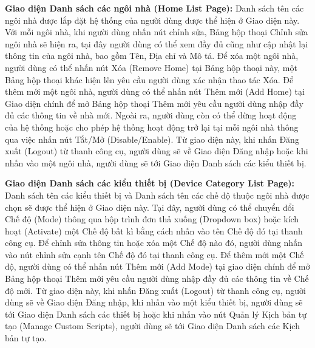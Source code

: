 \documentclass[11pt,a4paper,oneside]{book}
\begin{document}
\textbf{Giao diện Danh sách các ngôi nhà (Home List Page):} Danh sách tên các ngôi nhà được lắp đặt hệ thống của người dùng được thể hiện ở Giao diện này. Với mỗi ngôi nhà, khi người dùng nhấn nút chỉnh sửa, Bảng hộp thoại Chỉnh sửa ngôi nhà sẽ hiện ra, tại đây người dùng có thể xem đầy đủ cũng như cập nhật lại thông tin của ngôi nhà, bao gồm Tên, Địa chỉ và Mô tả. Để xóa một ngôi nhà, người dùng có thể nhấn nút Xóa (Remove Home) tại Bảng hộp thoại này, một Bảng hộp thoại khác hiện lên yêu cầu người dùng xác nhận thao tác Xóa. Để thêm mới một ngôi nhà, người dùng có thể nhấn nút Thêm mới (Add Home) tại Giao diện chính để mở Bảng hộp thoại Thêm mới yêu cầu người dùng nhập đầy đủ các thông tin về nhà mới. Ngoài ra, người dùng còn có thể dừng hoạt động của hệ thống hoặc cho phép hệ thống hoạt động trở lại tại mỗi ngôi nhà thông qua việc nhấn nút Tắt/Mở (Disable/Enable). Từ giao diện này, khi nhấn Đăng xuất (Logout) từ thanh công cụ, người dùng sẽ về Giao diện Đăng nhập hoặc khi nhấn vào một ngôi nhà, người dùng sẽ tới Giao diện Danh sách các kiểu thiết bị.

\textbf{Giao diện Danh sách các kiểu thiết bị (Device Category List Page):} Danh sách tên các kiểu thiết bị và Danh sách tên các chế độ thuộc ngôi nhà được chọn sẽ được thể hiện ở Giao diện này. Tại đây, người dùng có thể chuyển đổi Chế độ (Mode) thông qua hộp trình đơn thả xuống (Dropdown box) hoặc kích hoạt (Activate) một Chế độ bất kì bằng cách nhấn vào tên Chế độ đó tại thanh công cụ. Để chỉnh sửa thông tin hoặc xóa một Chế độ nào đó, người dùng nhấn vào nút chỉnh sửa cạnh tên Chế độ đó tại thanh công cụ. Để thêm mới một Chế độ, người dùng có thể nhấn nút Thêm mới (Add Mode) tại giao diện chính để mở Bảng hộp thoại Thêm mới yêu cầu người dùng nhập đầy đủ các thông tin về Chế độ mới. Từ giao diện này, khi nhấn Đăng xuất (Logout) từ thanh công cụ, người dùng sẽ về Giao diện Đăng nhập, khi nhấn vào một kiểu thiết bị, người dùng sẽ tới Giao diện Danh sách các thiết bị hoặc khi nhấn vào nút Quản lý Kịch bản tự tạo (Manage Custom Scripts), người dùng sẽ tới Giao diện Danh sách các Kịch bản tự tạo.
\end{document}
